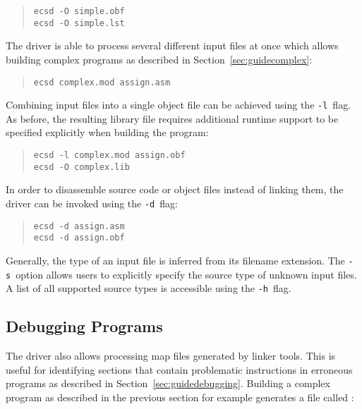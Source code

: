 \begin{quote}\begin{verbatim}
ecsd -O simple.obf
ecsd -O simple.lst
\end{verbatim}\end{quote}

The driver is able to process several different input files at once which allows building complex programs as described in Section~\ref{sec:guidecomplex}:

\begin{quote}\begin{verbatim}
ecsd complex.mod assign.asm
\end{verbatim}\end{quote}

Combining input files into a single object file can be achieved using the \texttt{-l}~flag.
As before, the resulting library file requires additional runtime support to be specified explicitly when building the program:

\begin{quote}\begin{verbatim}
ecsd -l complex.mod assign.obf
ecsd -O complex.lib
\end{verbatim}\end{quote}

In order to disassemble source code or object files instead of linking them, the driver can be invoked using the \texttt{-d}~flag:

\begin{quote}\begin{verbatim}
ecsd -d assign.asm
ecsd -d assign.obf
\end{verbatim}\end{quote}

Generally, the type of an input file is inferred from its filename extension.
The \texttt{-s}~option allows users to explicitly specify the source type of unknown input files.
A list of all supported source types is accessible using the \texttt{-h}~flag.

\subsection{Debugging Programs}

The \ecs{} driver also allows processing map files generated by linker tools.
This is useful for identifying sections that contain problematic instructions in erroneous programs as described in Section~\ref{sec:guidedebugging}.
Building a complex program as described in the previous section for example generates a file called :

